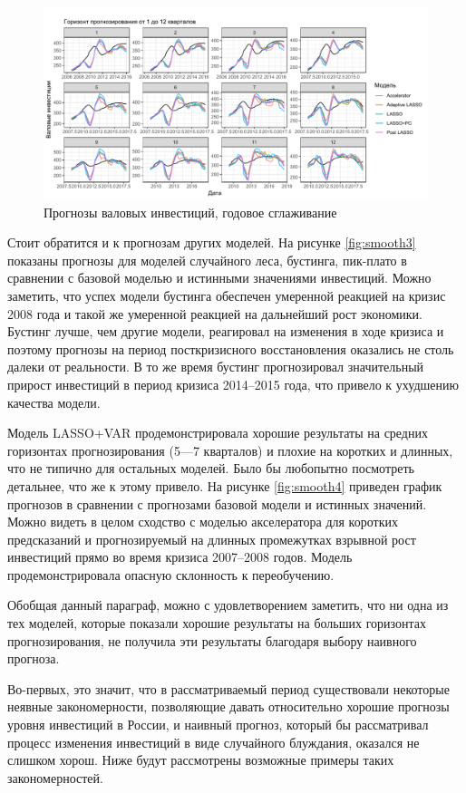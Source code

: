 \begin{figure}[h]
    \centering
    \includegraphics[width = \textwidth]{smooth2.pdf}
    \caption{Прогнозы валовых инвестиций, годовое сглаживание}
    \label{fig:smooth1}
\end{figure}

Стоит обратится и к прогнозам других моделей. На рисунке \ref{fig:smooth3} показаны прогнозы для моделей случайного леса, бустинга, пик-плато в сравнении с базовой моделью и истинными значениями инвестиций. Можно заметить, что успех модели бустинга обеспечен умеренной реакцией на кризис 2008 года и такой же умеренной реакцией на дальнейший рост экономики. Бустинг лучше, чем другие модели, реагировал на изменения в ходе кризиса и поэтому прогнозы на период посткризисного восстановления оказались не столь далеки от реальности. В то же время бустинг прогнозировал значительный прирост инвестиций в период кризиса 2014--2015 года, что привело к ухудшению качества модели.

Модель LASSO+VAR продемонстрировала хорошие результаты на средних горизонтах прогнозирования (5---7 кварталов) и плохие на коротких и длинных, что не типично для остальных моделей. Было бы любопытно посмотреть детальнее, что же к этому привело. На рисунке \ref{fig:smooth4} приведен график прогнозов в сравнении с прогнозами базовой модели и истинных значений. Можно видеть в целом сходство с моделью акселератора для коротких предсказаний и прогнозируемый на длинных промежутках взрывной рост инвестиций прямо во время кризиса 2007--2008 годов. Модель продемонстрировала опасную склонность к переобучению. 

Обобщая данный параграф, можно с удовлетворением заметить, что ни одна из тех моделей, которые показали хорошие результаты на больших горизонтах прогнозирования, не получила эти результаты благодаря выбору наивного прогноза. 

Во-первых, это значит, что в рассматриваемый период существовали некоторые неявные закономерности, позволяющие давать относительно хорошие прогнозы уровня инвестиций в России, и наивный прогноз, который бы рассматривал процесс изменения инвестиций в виде случайного блуждания, оказался не слишком хорош. Ниже будут рассмотрены возможные примеры таких закономерностей.


